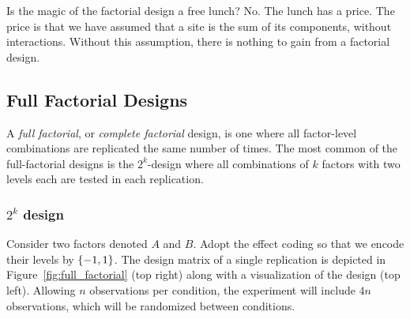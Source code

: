\begin{think}
Is the magic of the factorial design a free lunch? 
No. The lunch has a price.
The price is that we have assumed that a site is the sum of its components, without interactions. 
Without this assumption, there is nothing to gain from a factorial design.
\end{think}








\subsection{Full Factorial Designs}
A \emph{full factorial}, or \emph{complete factorial} design, is one where all factor-level combinations are replicated the same number of times.
The most common of the full-factorial designs is the $2^k$-design where all combinations of $k$ factors with two levels each are tested in each replication.



\subsubsection{$2^k$ design}
Consider two factors denoted $A$ and $B$.
Adopt the effect coding so that we encode their levels by $\{ -1,1 \}$.
The design matrix of a single replication is depicted in Figure~\ref{fig:full_factorial} (top right) along with a visualization of the design (top left).
Allowing $n$ observations per condition, the experiment will include $4n$ observations, which will be randomized between conditions.

